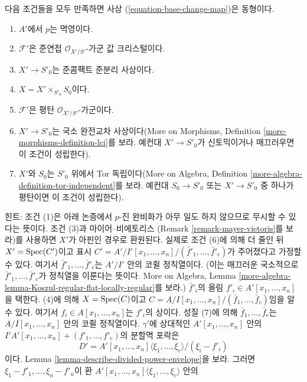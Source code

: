 \begin{remark}[기저변환 동형]
\label{remark-base-change-isomorphism}
다음 조건들을 모두 만족하면 사상 (\ref{equation-base-change-map})은
동형이다.
\begin{enumerate}
\item $A'$에서 $p$는 멱영이다.
\item $\mathcal{F}'$은 준연접 $\mathcal{O}_{X'/S'}$-가군 값
크리스털이다.
\item $X' \to S'_0$는 준콤팩트 준분리 사상이다.
\item $X = X' \times_{S'_0} S_0$이다.
\item $\mathcal{F}'$은 평탄 $\mathcal{O}_{X'/S'}$-가군이다.
\item $X' \to S'_0$는 국소 완전교차 사상이다(More on Morphisms,
Definition \ref{more-morphisms-definition-lci}를 보라. 예컨대
$X' \to S'_0$가 신토믹이거나 매끄러우면 이 조건이 성립한다).
\item $X'$와 $S_0$는 $S'_0$ 위에서 Tor 독립이다(More on Algebra,
Definition \ref{more-algebra-definition-tor-independent}를 보라. 예컨대
$S_0 \to S'_0$ 또는 $X' \to S'_0$ 중 하나가 평탄이면 이 조건이
성립한다).
\end{enumerate}
힌트: 조건 (1)은 아래 논증에서 $p$-진 완비화가 아무 일도 하지
않으므로 무시할 수 있다는 뜻이다. 조건 (3)과 마이어--비에토리스
(Remark \ref{remark-mayer-vietoris}를 보라)를 사용하면 $X'$가
아핀인 경우로 환원된다. 실제로 조건 (6)에 의해 더 줄인 뒤
$X' = \mathop{\mathrm{Spec}}(C')$이고 표시
$C' = A'/I'[x_1, \ldots, x_n]/(\bar f'_1, \ldots, \bar f'_c)$가
주어졌다고 가정할 수 있다. 여기서
$\bar f'_1, \ldots, \bar f'_c$는 $A'/I'$ 안의 코쥘 정칙열이다.
(이는 매끄러운 국소적으로 $\bar f'_1, \ldots, \bar f'_c$가
정칙열을 이룬다는 뜻이다. More on Algebra, Lemma
\ref{more-algebra-lemma-Koszul-regular-flat-locally-regular}를 보라.)
$\bar f'_i$의 올림 $f'_i \in A'[x_1, \ldots, x_n]$을 택한다.
(4)에 의해 $X = \mathop{\mathrm{Spec}}(C)$이고
$C = A/I[x_1, \ldots, x_n]/(\bar f_1, \ldots, \bar f_c)$임을
알 수 있다. 여기서 $f_i \in A[x_1, \ldots, x_n]$는 $f'_i$의
상이다. 성질 (7)에 의해 $\bar f_1, \ldots, \bar f_c$는
$A/I[x_1, \ldots, x_n]$ 안의 코쥘 정칙열이다.
$\gamma'$에 상대적인 $A'[x_1, \ldots, x_n]$ 안의
$I'A'[x_1, \ldots, x_n] + (f'_1, \ldots, f'_c)$의 분할멱 포락은
$$
D' = A'[x_1, \ldots, x_n]\langle \xi_1, \ldots, \xi_c \rangle/(\xi_i - f'_i)
$$
이다. Lemma \ref{lemma-describe-divided-power-envelope}을 보라.
그러면 $\xi_1 - f'_1, \ldots, \xi_n - f'_n$이 환
$A'[x_1, \ldots, x_n]\langle \xi_1, \ldots, \xi_c\rangle$ 안의

\end{remark}
